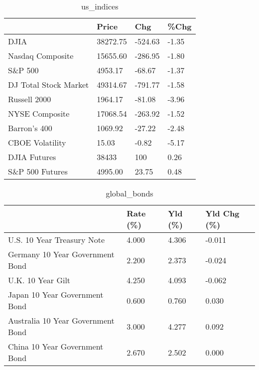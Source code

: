 \documentclass{article}%
\begin{document}
%


\begin{table}[htbp]%
\caption{us\_indices}%
\centering%
\begin{adjustbox}{width=1\textwidth}%
\begin{tabular}{llll}
\toprule
                      &    Price &     Chg &  \%Chg \\
\midrule
                 DJIA & 38272.75 & -524.63 & -1.35 \\
     Nasdaq Composite & 15655.60 & -286.95 & -1.80 \\
              S\&P 500 &  4953.17 &  -68.67 & -1.37 \\
DJ Total Stock Market & 49314.67 & -791.77 & -1.58 \\
         Russell 2000 &  1964.17 &  -81.08 & -3.96 \\
       NYSE Composite & 17068.54 & -263.92 & -1.52 \\
         Barron's 400 &  1069.92 &  -27.22 & -2.48 \\
      CBOE Volatility &    15.03 &   -0.82 & -5.17 \\
         DJIA Futures &    38433 &     100 &  0.26 \\
      S\&P 500 Futures &  4995.00 &   23.75 &  0.48 \\
\bottomrule
\end{tabular}
%
\end{adjustbox}%
\end{table}

%


\begin{table}[htbp]%
\caption{global\_bonds}%
\centering%
\begin{adjustbox}{width=1\textwidth}%
\begin{tabular}{llll}
\toprule
                                  & Rate (\%) & Yld (\%) & Yld Chg (\%) \\
\midrule
       U.S. 10 Year Treasury Note &    4.000 &   4.306 &      -0.011 \\
  Germany 10 Year Government Bond &    2.200 &   2.373 &      -0.024 \\
                U.K. 10 Year Gilt &    4.250 &   4.093 &      -0.062 \\
    Japan 10 Year Government Bond &    0.600 &   0.760 &       0.030 \\
Australia 10 Year Government Bond &    3.000 &   4.277 &       0.092 \\
    China 10 Year Government Bond &    2.670 &   2.502 &       0.000 \\
\bottomrule
\end{tabular}
%
\end{adjustbox}%
\end{table}
\end{document}
